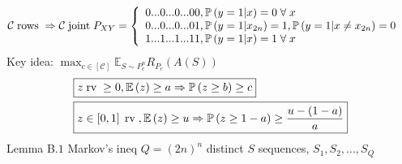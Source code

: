 \documentclass{article}
\begin{document}
\[ \mathcal{C} \text{\;rows\;} \Rightarrow  \mathcal{C} \text{\;joint\;} P_{XY} =\left\{ \begin{array}{ll}
0 ... 0 ... 0 ... 0 0, \mathbb{P}\left(y = 1 | x\right) = 0 \;\forall\; x  & \\
0 ... 0 ... 0 ... 0 1, \mathbb{P}\left(y = 1 | x_{2n}\right) = 1, \mathbb{P}\left(y = 1 | x \neq  x_{2n}\right) = 0 & \\
1 ... 1 ... 1 ... 1 1, \mathbb{P}\left(y = 1 | x\right) = 1 \;\forall\; x  & \\
\end{array}\right. \]
Key idea: $\displaystyle\max_{c \in \left[\mathcal{C}\right]} \mathbb{E}_{S \sim  P^{n}_{c}} R_{P_{c}}\left(A\left(S\right)\right)$
\begin{align*}
&\boxed{z \text{\;rv\;} \geq  0, \mathbb{E}\left(z\right) \geq  a \Rightarrow  \mathbb{P}\left(z \geq  b\right) \geq  c}
\\ &\boxed{z \in \left[0, 1\right] \text{\;rv\;}, \mathbb{E}\left(z\right) \geq  u \Rightarrow  \mathbb{P}\left(z \geq  1 - a\right) \geq  \dfrac{u - \left(1 - a\right)}{a}}
\end{align*}
Lemma B.$1$ Markov's ineq
\newline \newline
$Q  = \left(2 n\right)^{n}$ distinct $S $ sequences, $S_{1}, S_{2}, ..., S_{Q}$
\newline \newline
\end{document}

